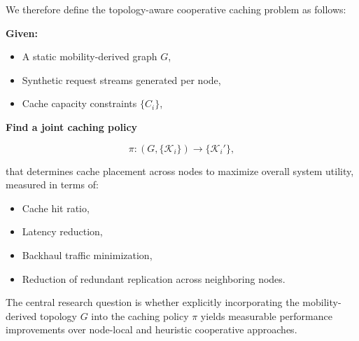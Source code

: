 We therefore define the topology-aware cooperative caching problem as follows:

\textbf{Given:}
\begin{itemize}
    \item A static mobility-derived graph $G$,
    \item Synthetic request streams generated per node,
    \item Cache capacity constraints $\{C_i\}$,
\end{itemize}

\textbf{Find a joint caching policy}

\[
\pi : (G, \{\mathcal{K}_i\}) \rightarrow \{\mathcal{K}_i'\},
\]

that determines cache placement across nodes to maximize overall system utility, measured in terms of:

\begin{itemize}
    \item Cache hit ratio,
    \item Latency reduction,
    \item Backhaul traffic minimization,
    \item Reduction of redundant replication across neighboring nodes.
\end{itemize}

The central research question is whether explicitly incorporating the mobility-derived topology $G$ into the caching policy $\pi$ yields measurable performance improvements over node-local and heuristic cooperative approaches.
